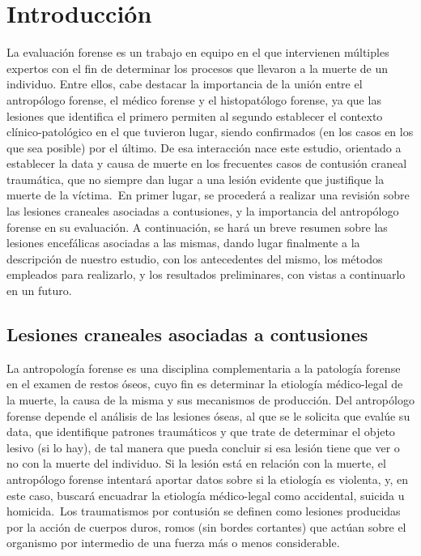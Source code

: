 \chapter{Introducción}
La evaluación forense es un trabajo en equipo en el que intervienen múltiples expertos con el fin de determinar los procesos que llevaron a la muerte de un individuo. Entre ellos, cabe destacar la importancia de la unión entre el antropólogo forense, el médico forense y el histopatólogo forense, ya que las lesiones que identifica el primero permiten al segundo establecer el contexto clínico-patológico en el que tuvieron lugar, siendo confirmados (en los casos en los que sea posible) por el último. De esa interacción nace este estudio, orientado a establecer la data y causa de muerte en los frecuentes casos de contusión craneal traumática, que no siempre dan lugar a una lesión evidente que justifique la muerte de la víctima.\ 
En primer lugar, se procederá a realizar una revisión sobre las lesiones craneales asociadas a contusiones, y la importancia del antropólogo forense en su evaluación. A continuación, se hará un breve resumen sobre las lesiones encefálicas asociadas a las mismas, dando lugar finalmente a la descripción de nuestro estudio, con los antecedentes del mismo, los métodos empleados para realizarlo, y los resultados preliminares, con vistas a continuarlo en un futuro.\ 

\section{Lesiones craneales asociadas a contusiones} \cite{Finnie2016} \cite{Kranioti2015} \cite{Sulaiman2014}
La antropología forense es una disciplina complementaria a la patología forense en el examen de restos óseos, cuyo fin es determinar la etiología médico-legal de la muerte, la causa de la misma y sus mecanismos de producción. Del antropólogo forense depende el análisis de las lesiones óseas, al que se le solicita que evalúe su data, que identifique patrones traumáticos y que trate de determinar el objeto lesivo (si lo hay), de tal manera que pueda concluir si esa lesión tiene que ver o no con la muerte del individuo. Si la lesión está en relación con la muerte, el antropólogo forense intentará aportar datos sobre si la etiología es violenta, y, en este caso, buscará encuadrar la etiología médico-legal como accidental, suicida u homicida.\ 
Los traumatismos por contusión se definen como lesiones producidas por la acción de cuerpos duros, romos (sin bordes cortantes) que actúan sobre el organismo por intermedio de una fuerza más o menos considerable.\
